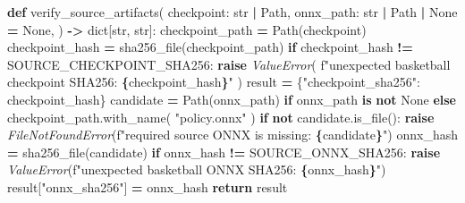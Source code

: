 \documentclass[
  chinese,
  11pt,
  letterpaper,
]{article}
\newenvironment{Shaded}{\begin{snugshade}}{\end{snugshade}}
\newcommand{\BuiltInTok}[1]{#1}
\newcommand{\ControlFlowTok}[1]{\textcolor[rgb]{0.13,0.29,0.53}{\textbf{#1}}}
\newcommand{\KeywordTok}[1]{\textcolor[rgb]{0.13,0.29,0.53}{\textbf{#1}}}
\newcommand{\NormalTok}[1]{#1}
\newcommand{\OperatorTok}[1]{\textcolor[rgb]{0.81,0.36,0.00}{\textbf{#1}}}
\newcommand{\PreprocessorTok}[1]{\textcolor[rgb]{0.56,0.35,0.01}{\textit{#1}}}
\newcommand{\SpecialCharTok}[1]{\textcolor[rgb]{0.81,0.36,0.00}{\textbf{#1}}}
\newcommand{\SpecialStringTok}[1]{\textcolor[rgb]{0.31,0.60,0.02}{#1}}
\newcommand{\StringTok}[1]{\textcolor[rgb]{0.31,0.60,0.02}{#1}}
\newcommand{\VariableTok}[1]{\textcolor[rgb]{0.00,0.00,0.00}{#1}}
\renewenvironment{Shaded}{\par\smallskip}{\par\smallskip}
\begin{document}
\begin{Shaded}
\begin{Highlighting}[]
\KeywordTok{def}\NormalTok{ verify\_source\_artifacts(}
\NormalTok{    checkpoint: }\BuiltInTok{str} \OperatorTok{|}\NormalTok{ Path,}
\NormalTok{    onnx\_path: }\BuiltInTok{str} \OperatorTok{|}\NormalTok{ Path }\OperatorTok{|} \VariableTok{None} \OperatorTok{=} \VariableTok{None}\NormalTok{,}
\NormalTok{) }\OperatorTok{{-}\textgreater{}} \BuiltInTok{dict}\NormalTok{[}\BuiltInTok{str}\NormalTok{, }\BuiltInTok{str}\NormalTok{]:}
\NormalTok{    checkpoint\_path }\OperatorTok{=}\NormalTok{ Path(checkpoint)}
\NormalTok{    checkpoint\_hash }\OperatorTok{=}\NormalTok{ sha256\_file(checkpoint\_path)}
    \ControlFlowTok{if}\NormalTok{ checkpoint\_hash }\OperatorTok{!=}\NormalTok{ SOURCE\_CHECKPOINT\_SHA256:}
        \ControlFlowTok{raise} \PreprocessorTok{ValueError}\NormalTok{(}
            \SpecialStringTok{f"unexpected basketball checkpoint SHA256: }\SpecialCharTok{\{}\NormalTok{checkpoint\_hash}\SpecialCharTok{\}}\SpecialStringTok{"}
\NormalTok{        )}
\NormalTok{    result }\OperatorTok{=}\NormalTok{ \{}\StringTok{"checkpoint\_sha256"}\NormalTok{: checkpoint\_hash\}}
\NormalTok{    candidate }\OperatorTok{=}\NormalTok{ Path(onnx\_path) }\ControlFlowTok{if}\NormalTok{ onnx\_path }\KeywordTok{is} \KeywordTok{not} \VariableTok{None} \ControlFlowTok{else}\NormalTok{ checkpoint\_path.with\_name(}
        \StringTok{"policy.onnx"}
\NormalTok{    )}
    \ControlFlowTok{if} \KeywordTok{not}\NormalTok{ candidate.is\_file():}
        \ControlFlowTok{raise} \PreprocessorTok{FileNotFoundError}\NormalTok{(}\SpecialStringTok{f"required source ONNX is missing: }\SpecialCharTok{\{}\NormalTok{candidate}\SpecialCharTok{\}}\SpecialStringTok{"}\NormalTok{)}
\NormalTok{    onnx\_hash }\OperatorTok{=}\NormalTok{ sha256\_file(candidate)}
    \ControlFlowTok{if}\NormalTok{ onnx\_hash }\OperatorTok{!=}\NormalTok{ SOURCE\_ONNX\_SHA256:}
        \ControlFlowTok{raise} \PreprocessorTok{ValueError}\NormalTok{(}\SpecialStringTok{f"unexpected basketball ONNX SHA256: }\SpecialCharTok{\{}\NormalTok{onnx\_hash}\SpecialCharTok{\}}\SpecialStringTok{"}\NormalTok{)}
\NormalTok{    result[}\StringTok{"onnx\_sha256"}\NormalTok{] }\OperatorTok{=}\NormalTok{ onnx\_hash}
    \ControlFlowTok{return}\NormalTok{ result}



\end{Highlighting}
\end{Shaded}
\end{document}
